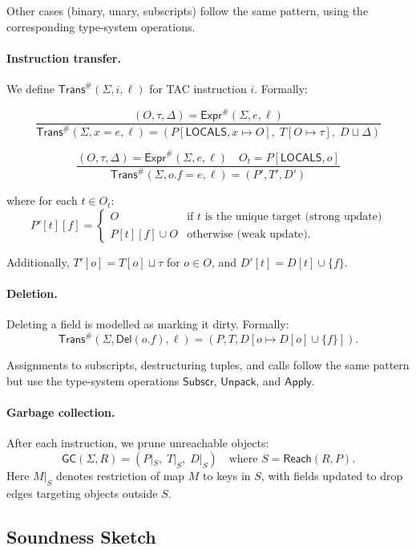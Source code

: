 Other cases (binary, unary, subscripts) follow the same pattern,
using the corresponding type-system operations.

\paragraph{Instruction transfer.}
We define $\mathsf{Trans}^\#(\Sigma, i, \ell)$ for TAC instruction $i$.
Formally:

\[
\frac{(O,\tau,\Delta) = \mathsf{Expr}^\#(\Sigma,e,\ell)}
     {\mathsf{Trans}^\#(\Sigma, x = e, \ell) =
       (P[\mathsf{LOCALS},x \mapsto O],\; T[O \mapsto \tau],\; D \sqcup \Delta)}
\]

\[
\frac{(O,\tau,\Delta) = \mathsf{Expr}^\#(\Sigma,e,\ell) \quad
      O_t = P[\mathsf{LOCALS},o]}
     {\mathsf{Trans}^\#(\Sigma, o.f = e, \ell) =
       (P', T', D')}
\]

\noindent
where for each $t \in O_t$:
\[
P'[t][f] =
\begin{cases}
O & \text{if $t$ is the unique target (strong update)} \\
P[t][f] \cup O & \text{otherwise (weak update).}
\end{cases}
\]

\noindent
Additionally, $T'[o] = T[o] \sqcup \tau$ for $o \in O$,
and $D'[t] = D[t] \cup \{f\}$.

\paragraph{Deletion.}
Deleting a field is modelled as marking it dirty. Formally:
\[
\mathsf{Trans}^\#(\Sigma, \mathsf{Del}(o.f), \ell) =
  (P, T, D[o \mapsto D[o] \cup \{f\}]).
\]

Assignments to subscripts, destructuring tuples, and calls
follow the same pattern but use the type-system operations
$\mathsf{Subscr}$, $\mathsf{Unpack}$, and $\mathsf{Apply}$.

\paragraph{Garbage collection.}
After each instruction, we prune unreachable objects:
\[
\mathsf{GC}(\Sigma, R) =
 (P|_S,\; T|_S,\; D|_S)
\quad\text{where } S = \mathsf{Reach}(R,P).
\]
Here $M|_S$ denotes restriction of map $M$ to keys in $S$,
with fields updated to drop edges targeting objects outside $S$.

\subsection{Soundness Sketch}


